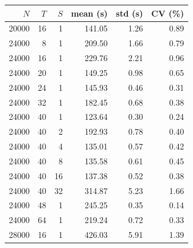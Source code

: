 \begin{tabular}{rrrrrr}
\toprule
$N$ & $T$ & $S$ & mean (s) & std (s) & CV (\%) \\
\midrule
20000 & 16 & 1 & 141.05 & 1.26 & 0.89 \\
24000 & 8 & 1 & 209.50 & 1.66 & 0.79 \\
24000 & 16 & 1 & 229.76 & 2.21 & 0.96 \\
24000 & 20 & 1 & 149.25 & 0.98 & 0.65 \\
24000 & 24 & 1 & 145.93 & 0.46 & 0.31 \\
24000 & 32 & 1 & 182.45 & 0.68 & 0.38 \\
24000 & 40 & 1 & 123.64 & 0.30 & 0.24 \\
24000 & 40 & 2 & 192.93 & 0.78 & 0.40 \\
24000 & 40 & 4 & 135.01 & 0.57 & 0.42 \\
24000 & 40 & 8 & 135.58 & 0.61 & 0.45 \\
24000 & 40 & 16 & 137.38 & 0.52 & 0.38 \\
24000 & 40 & 32 & 314.87 & 5.23 & 1.66 \\
24000 & 48 & 1 & 245.25 & 0.35 & 0.14 \\
24000 & 64 & 1 & 219.24 & 0.72 & 0.33 \\
28000 & 16 & 1 & 426.03 & 5.91 & 1.39 \\
\bottomrule
\end{tabular}
